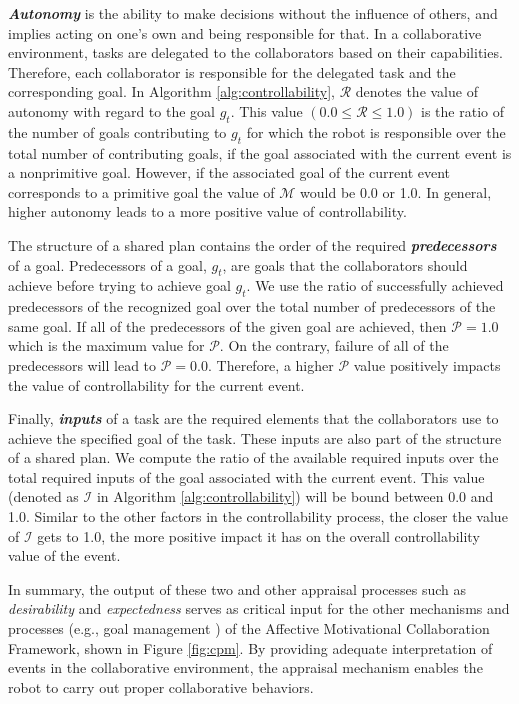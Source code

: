 \documentclass{article}
\begin{document}
\textit{\textbf{Autonomy}} is the ability to make decisions without the
influence of others, and implies acting on one's own and being responsible for
that. In a collaborative environment, tasks are delegated to the collaborators
based on their capabilities. Therefore, each collaborator is responsible for
the delegated task and the corresponding goal. In Algorithm
\ref{alg:controllability}, $\mathcal{R}$ denotes the value of autonomy with
regard to the goal $\mathit{g}_{t}$. This value $(0.0 \leq \mathcal{R} \leq
1.0)$ is the ratio of the number of goals contributing to $\mathit{g}_{t}$
for which the robot is responsible over the total number of contributing goals,
if the goal associated with the current event is a nonprimitive goal. However,
if the associated goal of the current event corresponds to a primitive goal the
value of $\mathcal{M}$ would be 0.0 or 1.0. In general, higher autonomy leads to
a more positive value of controllability.

The structure of a shared plan contains the order of the required
\textit{\textbf{predecessors}} of a goal. Predecessors of a goal, $g_t$, are
goals that the collaborators should achieve before trying to achieve goal $g_t$.
We use the ratio of successfully achieved predecessors of the recognized goal
over the total number of predecessors of the same goal. If all of the
predecessors of the given goal are achieved, then $\mathcal{P}=1.0$ which is the
maximum value for $\mathcal{P}$. On the contrary, failure of all of the
predecessors will lead to $\mathcal{P}=0.0$. Therefore, a higher $\mathcal{P}$
value positively impacts the value of controllability for the current event.

Finally, \textit{\textbf{inputs}} of a task are the required elements that the
collaborators use to achieve the specified goal of the task. These inputs are
also part of the structure of a shared plan. We compute the ratio of the
available required inputs over the total required inputs of the goal associated
with the current event. This value (denoted as $\mathcal{I}$ in Algorithm
\ref{alg:controllability}) will be bound between 0.0 and 1.0. Similar to the
other factors in the controllability process, the closer the value of
$\mathcal{I}$ gets to 1.0, the more positive impact it has on the overall
controllability value of the event.

In summary, the output of these two and other appraisal processes such as
\textit{desirability} \cite{shayganfar:emotional-awareness} and
\textit{expectedness} \cite{shayganfar:appraisal-short} serves as critical input
for the other mechanisms and processes (e.g., goal management
\cite{shayganfar:goal-management}) of the Affective Motivational Collaboration
Framework, shown in Figure \ref{fig:cpm}. By providing adequate interpretation
of events in the collaborative environment, the appraisal mechanism enables the
robot to carry out proper collaborative behaviors.
\end{document}
